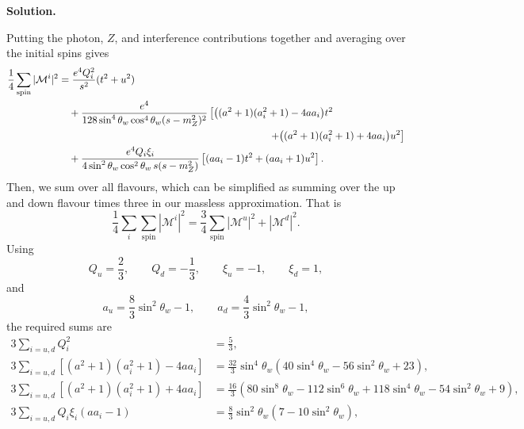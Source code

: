 \documentclass[a4paper,11pt]{article}
\newenvironment{solution}{\par\medskip\noindent\textbf{Solution.}\par\smallskip}{\par\medskip}
\begin{document}
\begin{solution}
Putting the photon, $Z$, and interference contributions together and
averaging over the initial spins gives
\begin{equation}
\begin{aligned}
    \frac{1}{4}\sum_\mathrm{spin}{|\mathcal{M}^i|^2}
    &=
    \frac{e^4Q_i^2}{s^2}(t^2+u^2)
    \\
    &\quad+
    \frac{e^4}
    {128\sin^4\theta_w\cos^4\theta_w(s-m_Z^2)^2}
    \left[
        \big((a^2+1)(a_i^2+1)-4aa_i\big)t^2
        \right.
        \\
        &\hspace{7.3cm}\left.
        +
        \big((a^2+1)(a_i^2+1)+4aa_i\big)u^2
    \right]
    \\
    &\quad+
    \frac{e^4Q_i\xi_i}
    {4\sin^2\theta_w\cos^2\theta_w\,
    s(s-m_Z^2)}
    \left[
        (aa_i-1)t^2+(aa_i+1)u^2
    \right].
\end{aligned}
\end{equation}
Then, we sum over all flavours, which can be simplified as summing over the up and down flavour times three in our massless approximation. That is
\begin{equation}
    \frac{1}{4}\sum_i\sum_\mathrm{spin}{|\mathcal{M}^i|^2} = \frac{3}{4}\sum_\mathrm{spin}{|\mathcal{M}^u|^2 + |\mathcal{M}^d|^2}.
\end{equation}
Using
\begin{equation}
    Q_u=\frac{2}{3},
    \qquad
    Q_d=-\frac{1}{3},
    \qquad
    \xi_u=-1,
    \qquad
    \xi_d=1,
\end{equation}
and
\begin{equation}
    a_u=\frac{8}{3}\sin^2\theta_w-1,
    \qquad
    a_d=\frac{4}{3}\sin^2\theta_w-1,
\end{equation}
the required sums are
\begin{equation}
\begin{aligned}
    3\sum_{i=u,d}Q_i^2
    &=\frac{5}{3},\\
    3\sum_{i=u,d}
    \left[(a^2+1)(a_i^2+1)-4aa_i\right]
    &=
    \frac{32}{3}\sin^4\theta_w
    \left(
        40\sin^4\theta_w-56\sin^2\theta_w+23
    \right),\\
    3\sum_{i=u,d}
    \left[(a^2+1)(a_i^2+1)+4aa_i\right]
    &=
    \frac{16}{3}
    \left(
        80\sin^8\theta_w-112\sin^6\theta_w
        +118\sin^4\theta_w-54\sin^2\theta_w+9
    \right),\\
    3\sum_{i=u,d}Q_i\xi_i(aa_i-1)
    &=
    \frac{8}{3}\sin^2\theta_w
    \left(7-10\sin^2\theta_w\right),\\

\end{aligned}
\end{equation}
\end{solution}
\end{document}
